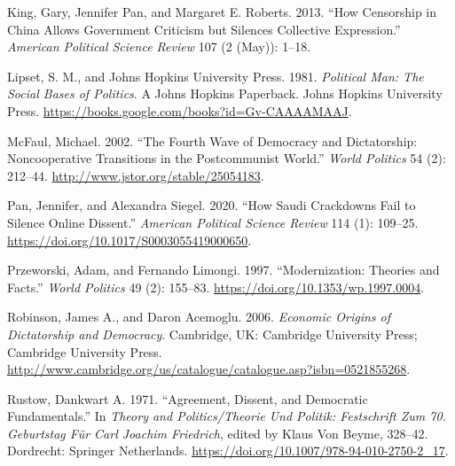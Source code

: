 \documentclass[12pt,]{article}
\begin{document}
\leavevmode\hypertarget{ref-king}{}%
King, Gary, Jennifer Pan, and Margaret E. Roberts. 2013. ``How
Censorship in China Allows Government Criticism but Silences Collective
Expression.'' \emph{American Political Science Review} 107 (2 (May)):
1--18.

\leavevmode\hypertarget{ref-lipset}{}%
Lipset, S. M., and Johns Hopkins University Press. 1981. \emph{Political
Man: The Social Bases of Politics}. A Johns Hopkins Paperback. Johns
Hopkins University Press.
\url{https://books.google.com/books?id=Gv-CAAAAMAAJ}.

\leavevmode\hypertarget{ref-mcfaul}{}%
McFaul, Michael. 2002. ``The Fourth Wave of Democracy and Dictatorship:
Noncooperative Transitions in the Postcommunist World.'' \emph{World
Politics} 54 (2): 212--44. \url{http://www.jstor.org/stable/25054183}.

\leavevmode\hypertarget{ref-pan2020}{}%
Pan, Jennifer, and Alexandra Siegel. 2020. ``How Saudi Crackdowns Fail
to Silence Online Dissent.'' \emph{American Political Science Review}
114 (1): 109--25. \url{https://doi.org/10.1017/S0003055419000650}.

\leavevmode\hypertarget{ref-przeworski}{}%
Przeworski, Adam, and Fernando Limongi. 1997. ``Modernization: Theories
and Facts.'' \emph{World Politics} 49 (2): 155--83.
\url{https://doi.org/10.1353/wp.1997.0004}.

\leavevmode\hypertarget{ref-robinson}{}%
Robinson, James A., and Daron Acemoglu. 2006. \emph{Economic Origins of
Dictatorship and Democracy}. Cambridge, UK: Cambridge University Press;
Cambridge University Press.
\url{http://www.cambridge.org/us/catalogue/catalogue.asp?isbn=0521855268}.

\leavevmode\hypertarget{ref-rustow}{}%
Rustow, Dankwart A. 1971. ``Agreement, Dissent, and Democratic
Fundamentals.'' In \emph{Theory and Politics/Theorie Und Politik:
Festschrift Zum 70. Geburtstag Für Carl Joachim Friedrich}, edited by
Klaus Von Beyme, 328--42. Dordrecht: Springer Netherlands.
\url{https://doi.org/10.1007/978-94-010-2750-2_17}.





\newpage
\singlespacing 
\end{document}

